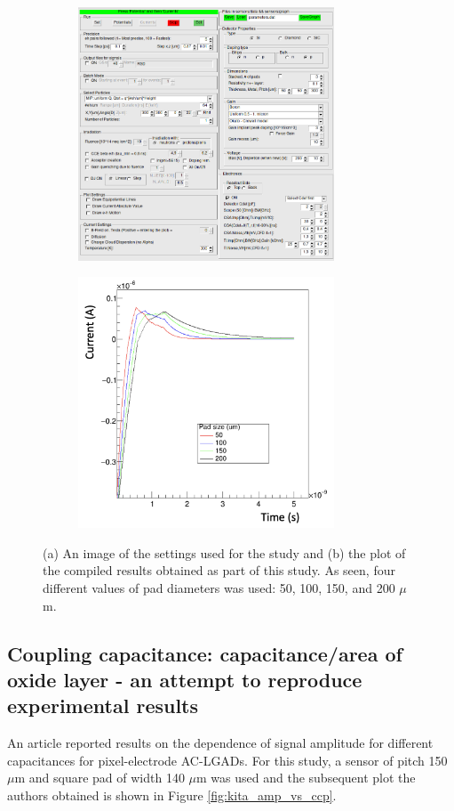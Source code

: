 \documentclass[11pt]{article}
\begin{document}
\begin{figure}[h!]
    \centering
    \begin{subfigure}[t]{0.49\textwidth}
        \centering
        \includegraphics[width=3in]{Images/pad_size_other_settings.png}
        \caption{}
        \label{fig:pad_size_other_settings}
    \end{subfigure}%
    \begin{subfigure}[t]{0.49\textwidth}
        \centering
        \includegraphics[width=3in]{Images/pad_size_plot.png}
        \caption{}
        \label{fig:pad_size_plot}
    \end{subfigure}
    \caption{(a) An image of the settings used for the study and (b) the plot of the compiled results obtained as part of this study. As seen, four different values of pad diameters was used: 50, 100, 150, and 200 $\mu$m.}
    \label{fig:varying_pad_size}
\end{figure}

\subsection{Coupling capacitance: capacitance/area of oxide layer - an attempt to reproduce experimental results}\label{sec:varying-ccp-code}
An article \cite{kita2023} reported results on the dependence of signal amplitude for different capacitances for pixel-electrode AC-LGADs.  For this study, a sensor of pitch 150 $\mu$m and square pad of width 140 $\mu$m was used and the subsequent plot the authors obtained is shown in Figure \ref{fig:kita_amp_vs_ccp}.
\end{document}

